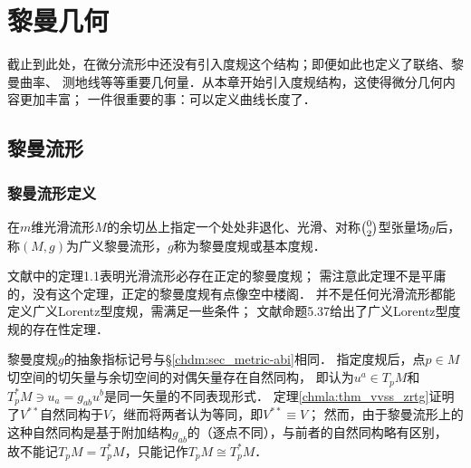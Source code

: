 
\chapter{黎曼几何}\label{chrg}



截止到此处，在微分流形中还没有引入度规这个结构；即便如此也定义了联络、黎曼曲率、
测地线等等重要几何量．从本章开始引入度规结构，这使得微分几何内容更加丰富；
一件很重要的事：可以定义曲线长度了．


\section{黎曼流形}\label{chrg:sec_riemann}

\subsection{黎曼流形定义}\label{chrg:sec_riemann-metric}
\begin{definition}
    在$m$维光滑流形$M$的余切丛上指定一个处处非退化、光滑、对称$\binom{0}{2}$型张量场$g$后，
    称$(M,g)$为{\heiti 广义黎曼流形}，$g$称为{\heiti 黎曼度规}或{\heiti 基本度规}．
\end{definition}


\begin{remark}
    文献\parencite[\S 5.1]{cc2001-zh}中的定理1.1表明光滑流形必存在正定的黎曼度规；
    需注意此定理不是平庸的，没有这个定理，正定的黎曼度规有点像空中楼阁．
    并不是任何光滑流形都能定义广义Lorentz型度规，需满足一些条件；
    文献\parencite{oneill1983}命题5.37给出了广义Lorentz型度规的存在性定理．
\end{remark}

\begin{remark}
    黎曼度规$g$的抽象指标记号与\S\ref{chdm:sec_metric-abi}相同．
    指定度规后，点$p\in M$切空间的切矢量与余切空间的对偶矢量存在自然同构，
    即认为$u^a\in T_pM$和$T^*_pM \ni u_a = g_{ab}u^b$是同一矢量的不同表现形式．
    定理\ref{chmla:thm_vvss_zrtg}证明了$V^{**}$自然同构于$V$，继而将两者认为等同，即$V^{**}\equiv V$；
    然而，由于黎曼流形上的这种自然同构是基于附加结构$g_{ab}$的（逐点不同），与前者的自然同构略有区别，
    故不能记$T_pM=T^*_pM$，只能记作$T_pM\cong T^*_pM$．
\end{remark}

